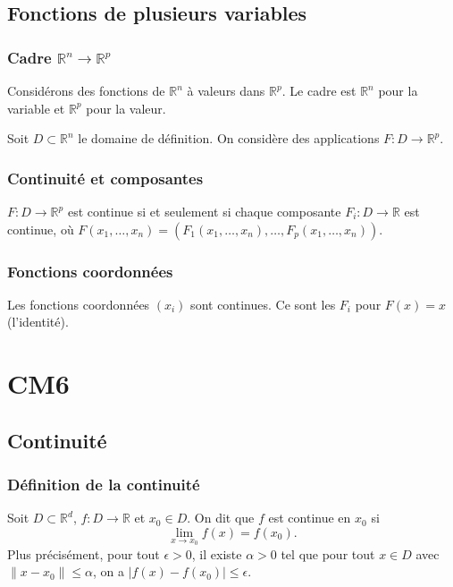 \documentclass[oneside]{book}
\begin{document}
\section{Fonctions de plusieurs variables}

\subsection{Cadre $\mathbb{R}^n \to \mathbb{R}^p$}

Considérons des fonctions de $\mathbb{R}^n$ à valeurs dans $\mathbb{R}^p$. Le cadre est $\mathbb{R}^n$ pour la variable et $\mathbb{R}^p$ pour la valeur.

Soit $D \subset \mathbb{R}^n$ le domaine de définition. On considère des applications $F : D \to \mathbb{R}^p$.

\subsection{Continuité et composantes}

\begin{proposition}
$F : D \to \mathbb{R}^p$ est continue si et seulement si chaque composante $F_i : D \to \mathbb{R}$ est continue, où $F(x_1, \dots, x_n) = (F_1(x_1, \dots, x_n), \dots, F_p(x_1, \dots, x_n))$.
\end{proposition}

\subsection{Fonctions coordonnées}

Les fonctions coordonnées $(x_i)$ sont continues. Ce sont les $F_i$ pour $F(x) = x$ (l'identité).\chapter{CM6}
\sloppy

\section{Continuité}

\subsection{Définition de la continuité}

\begin{definition}
Soit $D \subset \mathbb{R}^d$, $f: D \rightarrow \mathbb{R}$ et $x_0 \in D$.
On dit que $f$ est continue en $x_0$ si
\[
\lim_{x \rightarrow x_0} f(x) = f(x_0).
\]
Plus précisément, pour tout $\epsilon > 0$, il existe $\alpha > 0$ tel que pour tout $x \in D$ avec $\|x - x_0\| \leq \alpha$, on a $|f(x) - f(x_0)| \leq \epsilon$.
\end{definition}
\end{document}
